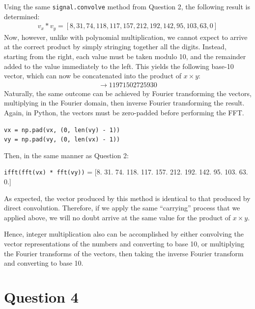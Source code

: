 \documentclass[a4paper, 11pt]{article}
\begin{document}
Using the same \texttt{signal.convolve} method from Question 2, the following
result is determined:
\begin{align*}
    v_x \ast v_y = [8, 31, 74, 118, 117, 157, 212, 192, 142, 95, 103, 63, 0]
\end{align*}
Now, however, unlike with polynomial multiplication, we cannot expect to
arrive at the correct product by simply stringing together all the digits.
Instead, starting from the right, each value must be taken modulo 10, and the
remainder added to the value immediately to the left. This yields the following
base-10 vector, which can now be concatenated into the product of $x \times y$:
\begin{align*}
    [1, 1, 9, 7, 1, 5, 0, 2, 7, 2, 5, 9, 3, 0] \longrightarrow 11971502725930
\end{align*}
Naturally, the same outcome can be achieved by Fourier transforming the vectors,
multiplying in the Fourier domain, then inverse Fourier transforming the result.
Again, in Python, the vectors must be zero-padded before performing the FFT.
\begin{center}
    \texttt{vx = np.pad(vx, (0, len(vy) - 1))} \\
    \texttt{vy = np.pad(vy, (0, len(vx) - 1))}
\end{center}
Then, in the same manner as Question 2:
\begin{center}
    \texttt{ifft(fft(vx) * fft(vy))} =
        [8.  31.  74. 118. 117. 157. 212. 192. 142.  95. 103.  63.   0.]
\end{center}
As expected, the vector produced by this method is identical to that produced by
direct convolution. Therefore, if we apply the same ``carrying'' process that we
applied above, we will no doubt arrive at the same value for the product of
$x\times y$.

Hence, integer multiplication also can be accomplished by either convolving the
vector representations of the numbers and converting to base 10, or multiplying
the Fourier transforms of the vectors, then taking the inverse Fourier transform
and converting to base 10.

\newpage
\section*{Question 4}
\end{document}
